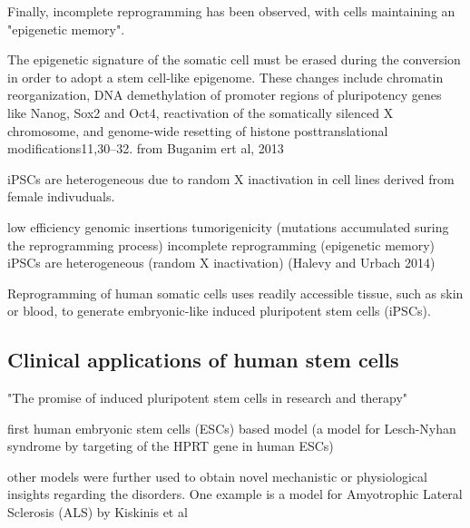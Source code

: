 Finally, incomplete reprogramming has been observed, with cells maintaining an "epigenetic memory".

The epigenetic signature of the somatic cell must be erased during the conversion in order to adopt a stem cell-like epigenome. These changes include chromatin reorganization, DNA demethylation of promoter regions of pluripotency genes like Nanog, Sox2 and Oct4, reactivation of the somatically silenced X chromosome, and genome-wide resetting of histone posttranslational modifications11,30–32.
from Buganim ert al, 2013 \cite{buganim2013mechanisms}

iPSCs are heterogeneous due to random X inactivation in cell lines derived from female indivuduals.



low efficiency
genomic insertions
tumorigenicity 
(mutations accumulated suring the reprogramming process)
incomplete reprogramming (epigenetic memory)
iPSCs are heterogeneous (random X inactivation)
\cite{halevy2014comparing} (Halevy and Urbach 2014)

\cite{park2008reprogramming}

Reprogramming of human somatic cells uses readily accessible tissue, such as skin or blood, to generate embryonic-like induced pluripotent stem cells (iPSCs). \cite{saha2009technical}



\subsection{Clinical applications of human stem cells}

"The promise of induced pluripotent stem cells in research and therapy" \cite{robinton2012promise}

first human embryonic stem cells (ESCs) based model (a model for Lesch-Nyhan syndrome by targeting of the HPRT gene in human ESCs)\cite{urbach2004modeling}
\cite{halevy2014comparing}

other models were further used to obtain novel mechanistic or physiological insights regarding the disorders. One example is a model for Amyotrophic Lateral Sclerosis (ALS) by Kiskinis et al \cite{kiskinis2014pathways} \\


